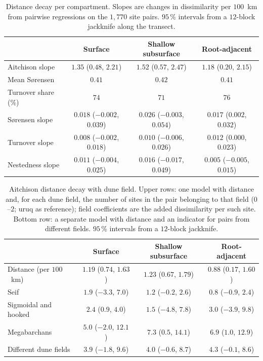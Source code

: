 \documentclass[11pt]{article}
\begin{document}
\begin{table}[htbp]\centering\small
\caption{Distance decay per compartment. Slopes are changes in dissimilarity per $100$~km from pairwise regressions on the $1{,}770$ site pairs. $95\,\%$ intervals from a $12$-block jackknife along the transect.}\label{tab:decay}
\begin{tabular}{lccc}\toprule
 & Surface & Shallow subsurface & Root-adjacent \\\midrule
Aitchison slope & $1.35$ ($0.48$, $2.21$) & $1.52$ ($0.57$, $2.47$) & $1.18$ ($0.20$, $2.15$) \\\addlinespace
Mean S\o{}rensen & $0.41$ & $0.42$ & $0.41$ \\
Turnover share (\%) & $74$ & $71$ & $76$ \\\addlinespace
S\o{}rensen slope & $0.018$ ($-0.002$, $0.039$) & $0.026$ ($-0.003$, $0.054$) & $0.017$ ($0.002$, $0.032$) \\
Turnover slope & $0.008$ ($-0.002$, $0.018$) & $0.010$ ($-0.006$, $0.026$) & $0.012$ ($0.000$, $0.023$) \\
Nestedness slope & $0.011$ ($-0.004$, $0.025$) & $0.016$ ($-0.017$, $0.049$) & $0.005$ ($-0.005$, $0.015$) \\\bottomrule
\end{tabular}\end{table}

\begin{table}[htbp]\centering\small
\caption{Aitchison distance decay with dune field. Upper rows: one model with distance and, for each dune field, the number of sites in the pair belonging to that field ($0$--$2$; uruq as reference); field coefficients are the added dissimilarity per such site. Bottom row: a separate model with distance and an indicator for pairs from different fields. $95\,\%$ intervals from a $12$-block jackknife.}\label{tab:decay_dune}
\begin{tabular}{lccc}\toprule
 & Surface & Shallow subsurface & Root-adjacent \\\midrule
Distance (per $100$~km) & $1.19$ ($0.74$, $1.63$) & $1.23$ ($0.67$, $1.79$) & $0.88$ ($0.17$, $1.60$) \\
Seif & $1.9$ ($-3.3$, $7.0$) & $1.2$ ($-0.2$, $2.6$) & $0.8$ ($-0.9$, $2.4$) \\
Sigmoidal and hooked & $2.4$ ($0.9$, $4.0$) & $1.5$ ($-4.8$, $7.8$) & $3.0$ ($-3.9$, $9.8$) \\
Megabarchans & $5.0$ ($-2.0$, $12.1$) & $7.3$ ($0.5$, $14.1$) & $6.9$ ($1.0$, $12.9$) \\\midrule
Different dune fields & $3.9$ ($-1.8$, $9.6$) & $4.0$ ($-0.6$, $8.7$) & $4.3$ ($-0.1$, $8.6$) \\\bottomrule
\end{tabular}\end{table}


\clearpage

\clearpage



\end{document}
